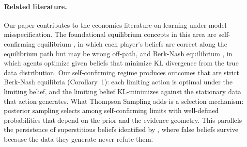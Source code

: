 \documentclass[12pt]{article}
\begin{document}
\paragraph{Related literature.}
Our paper contributes to the economics literature on learning under model misspecification. The foundational equilibrium concepts in this area are self-confirming equilibrium \citep{fudenbergSelfConfirmingEquilibrium1993}, in which each player's beliefs are correct along the equilibrium path but may be wrong off-path, and Berk-Nash equilibrium \citep{espondaBerkNashEquilibrium2016}, in which agents optimize given beliefs that minimize KL divergence from the true data distribution. Our self-confirming regime produces outcomes that are strict Berk-Nash equilibria (Corollary~1): each limiting action is optimal under the limiting belief, and the limiting belief KL-minimizes against the stationary data that action generates. What Thompson Sampling adds is a selection mechanism: posterior sampling selects among self-confirming limits with well-defined probabilities that depend on the prior and the evidence geometry. This parallels the persistence of superstitious beliefs identified by \citet{fudenbergSuperstitionRationalLearning2006}, where false beliefs survive because the data they generate never refute them.
\end{document}
